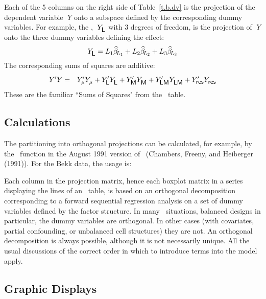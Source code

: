 Each of the 5 columns
on the right side of Table~\ref{t.b.dv} is the projection of
the dependent variable $\;Y$ onto a subspace defined
by the corresponding dummy variables.  For example, the
, $\;Y_{\mbox{{\protect\small\sf L}}}$ with 3 degrees of freedom,
is the projection of $\;Y$ onto the three dummy variables defining
the  effect:
$$
Y_{\mbox{{\protect\small\sf L}}}
  = L_1\widehat\beta_{\!L_1} + L_2\widehat\beta_{\!L_2} +
    L_3\widehat\beta_{\!L_3}
$$
%
The corresponding sums of squares are additive:
%
\begin{eqnarray*}
   Y'Y &=& Y_{\mu}            ' Y_{\mu}^\pp +
	   Y_{\mbox{\s{L}}}   ' Y_{\mbox{\s{L}}}^\pp +
	   Y_{\mbox{\s{M}}}   ' Y_{\mbox{\s{M}}}^\pp +
	   Y_{\mbox{\s{LM}}}  ' Y_{\mbox{\s{LM}}}^\pp +
	   Y_{\mbox{\s{res}}} ' Y_{\mbox{\s{res}}}^\pp
\end{eqnarray*}
%
These are the familiar ``Sums of Squares" from the \ANOVA\ table.


\subsection{Calculations}

The partitioning into orthogonal projections can be calculated, for example,
by the \ANOVA\ function 
in the August 1991 version of \iS\ (Chambers, Freeny, and
Heiberger (1991)).  For the Bekk data, the usage is:

\noindent
\quad{}

\noindent
\quad{}

\noindent
Each column in the projection matrix, hence each
boxplot matrix in a series displaying the lines of an
\ANOVA\ table, is based on an orthogonal decomposition
corresponding to a forward sequential regression analysis on a
set of dummy variables defined by the factor structure.  In many
\ANOVA\ situations, balanced designs in particular, the dummy
variables are orthogonal.  In other cases (with covariates,
partial confounding, or unbalanced cell structures) they are not.
An orthogonal decomposition is always possible, although it is
not necessarily unique.  All the usual discussions of the correct
order in which to introduce terms into the model apply.



\subsection{Graphic Displays}

